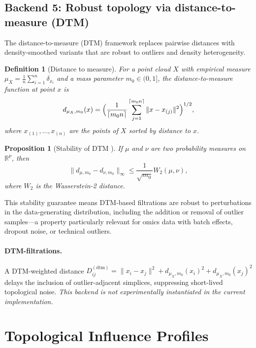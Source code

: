 \documentclass[11pt]{article}
\newtheorem{proposition}[theorem]{Proposition}
\newtheorem{definition}[theorem]{Definition}
\begin{document}
\subsection{Backend 5: Robust topology via distance-to-measure (DTM)}
\label{sec:dtm}

The distance-to-measure (DTM) framework \cite{chazal2011dtm, chazal2017robust} replaces pairwise distances with density-smoothed variants that are robust to outliers and density heterogeneity.

\begin{definition}[Distance to measure]
For a point cloud $X$ with empirical measure $\mu_X = \frac{1}{n}\sum_{i=1}^n \delta_{x_i}$ and a mass parameter $m_0 \in (0,1]$, the \emph{distance-to-measure function} at point $x$ is
\[
d_{\mu_X, m_0}(x) = \Bigl( \frac{1}{\lceil m_0 n \rceil} \sum_{j=1}^{\lceil m_0 n \rceil} \|x - x_{(j)}\|^2 \Bigr)^{1/2},
\]
where $x_{(1)}, \ldots, x_{(n)}$ are the points of $X$ sorted by distance to $x$.
\end{definition}

\begin{proposition}[Stability of DTM \cite{chazal2011dtm}]
If $\mu$ and $\nu$ are two probability measures on $\mathbb{R}^p$, then
\[
\|d_{\mu, m_0} - d_{\nu, m_0}\|_\infty \le \frac{1}{\sqrt{m_0}} W_2(\mu, \nu),
\]
where $W_2$ is the Wasserstein-2 distance.
\end{proposition}

This stability guarantee means DTM-based filtrations are robust to perturbations in the data-generating distribution, including the addition or removal of outlier samples---a property particularly relevant for omics data with batch effects, dropout noise, or technical outliers.

\paragraph{DTM-filtrations.}
A DTM-weighted distance $D^{(\text{dtm})}_{ij} = \|x_i - x_j\|^2 + d_{\mu_X, m_0}(x_i)^2 + d_{\mu_X, m_0}(x_j)^2$ delays the inclusion of outlier-adjacent simplices, suppressing short-lived topological noise.
\emph{This backend is not experimentally instantiated in the current implementation.}

\section{Topological Influence Profiles}
\label{sec:tip}
\end{document}
